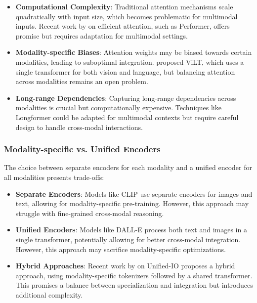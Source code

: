 \begin{itemize}
    \item \textbf{Computational Complexity}: Traditional attention mechanisms scale quadratically with input size, which becomes problematic for multimodal inputs. Recent work by \citet{choromanski2021rethinking} on efficient attention, such as Performer, offers promise but requires adaptation for multimodal settings.
    
    \item \textbf{Modality-specific Biases}: Attention weights may be biased towards certain modalities, leading to suboptimal integration. \citet{kim2021vilt} proposed ViLT, which uses a single transformer for both vision and language, but balancing attention across modalities remains an open problem.
    
    \item \textbf{Long-range Dependencies}: Capturing long-range dependencies across modalities is crucial but computationally expensive. Techniques like Longformer \citep{beltagy2020longformer} could be adapted for multimodal contexts but require careful design to handle cross-modal interactions.
\end{itemize}

\subsubsection{Modality-specific vs. Unified Encoders}
The choice between separate encoders for each modality and a unified encoder for all modalities presents trade-offs:

\begin{itemize}
    \item \textbf{Separate Encoders}: Models like CLIP \citep{radford2021learning} use separate encoders for images and text, allowing for modality-specific pre-training. However, this approach may struggle with fine-grained cross-modal reasoning.
    
    \item \textbf{Unified Encoders}: Models like DALL-E \citep{ramesh2021zero} process both text and images in a single transformer, potentially allowing for better cross-modal integration. However, this approach may sacrifice modality-specific optimizations.
    
    \item \textbf{Hybrid Approaches}: Recent work by \citet{lu2022unified} on Unified-IO proposes a hybrid approach, using modality-specific tokenizers followed by a shared transformer. This promises a balance between specialization and integration but introduces additional complexity.
\end{itemize}

